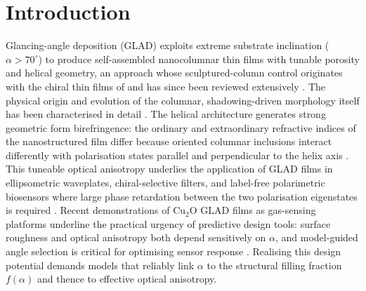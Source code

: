 \documentclass[aip,amsmath,amssymb,reprint]{revtex4-1}
\newcommand{\dang}{\ensuremath{\alpha}}
\begin{document}
\maketitle

\section{Introduction}
\label{sec:intro}

Glancing-angle deposition (GLAD) exploits extreme substrate inclination
($\dang > 70^{\circ}$) to produce self-assembled nanocolumnar thin films with
tunable porosity and helical geometry, an approach whose sculptured-column
control originates with the chiral thin films of \citet{robbie1996nature}
and has since been reviewed extensively
\citep[see reviews by][]{hawkeye2014,barranco2016,hawkeye2007,brett2008science,lakhtakia2005stf}.
The physical origin and evolution of the columnar, shadowing-driven
morphology itself has been characterised in detail
\citep{messier2000origin,steele2007porous}.
The helical architecture generates strong geometric form birefringence:
the ordinary and extraordinary refractive indices of the nanostructured
film differ because oriented columnar inclusions interact differently
with polarisation states parallel and perpendicular to the helix axis
\citep{robbie1997}.
This tuneable optical anisotropy underlies the application of GLAD films
in ellipsometric waveplates, chiral-selective filters, and label-free
polarimetric biosensors where large phase retardation between the two
polarisation eigenstates is required \citep{fischerscubert2013,chaffar2018}.
Recent demonstrations of Cu$_2$O GLAD films as gas-sensing platforms
underline the practical urgency of predictive design tools: surface
roughness and optical anisotropy both depend sensitively on $\dang$,
and model-guided angle selection is critical for optimising sensor response
\citep{benamor2026}.
Realising this design potential demands models that reliably link
$\dang$ to the structural filling fraction $f(\dang)$ and thence to
effective optical anisotropy.
\end{document}
